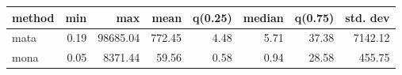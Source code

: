\begin{tabular}{lrrrrrrr}
\hline
 method   &   min &      max &   mean &   q(0.25) &   median &   q(0.75) &   std. dev \\
\hline
 mata     &  0.19 & 98685.04 & 772.45 &      4.48 &     5.71 &     37.38 &    7142.12 \\
 mona     &  0.05 &  8371.44 &  59.56 &      0.58 &     0.94 &     28.58 &     455.75 \\
\hline
\end{tabular}

